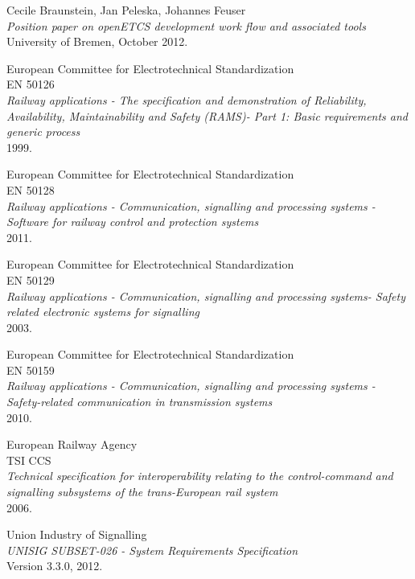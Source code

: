 \documentclass{template/openetcs_report}
\begin{document}
\begin{thebibliography}{99}
  Cecile Braunstein, Jan Peleska, Johannes Feuser\\
  \emph{Position paper on openETCS development work flow and associated tools}\\
  University of Bremen,
  October 2012.

  European Committee for Electrotechnical Standardization\\EN 50126\\
  \emph{Railway applications - The specification and demonstration of Reliability, Availability, Maintainability and Safety (RAMS)- Part 1: Basic requirements and generic process}\\
  1999.

  European Committee for Electrotechnical Standardization\\EN 50128\\
  \emph{Railway applications - Communication, signalling and processing systems - Software for railway control and protection systems}\\
  2011.

  European Committee for Electrotechnical Standardization\\EN 50129\\
  \emph{Railway applications - Communication, signalling and processing systems- Safety related electronic systems for signalling}\\
  2003.

  European Committee for Electrotechnical Standardization\\EN 50159\\
  \emph{Railway applications - Communication, signalling and processing systems - Safety-related communication in transmission systems}\\
  2010.

  European Railway Agency\\TSI CCS\\
  \emph{Technical specification for interoperability relating to the control-command and signalling subsystems of the trans-European rail system}\\
  2006.

  Union Industry of Signalling\\
  \emph{ UNISIG SUBSET-026 - System Requirements Specification}\\
  Version 3.3.0,
  2012.


\end{thebibliography}
\end{document}

